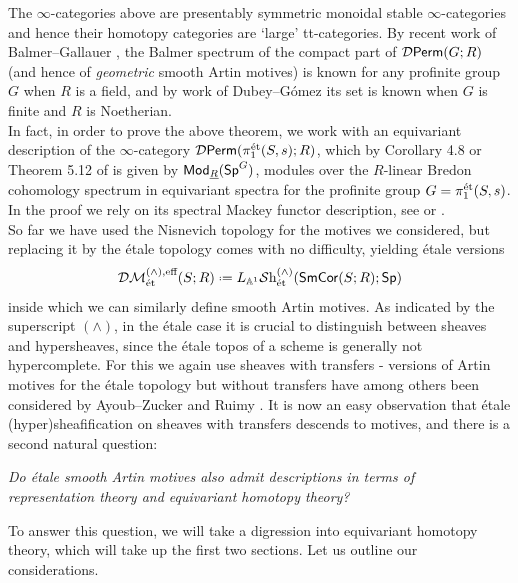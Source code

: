 \documentclass[reqno]{amsart}
\numberwithin{equation}{section}\theoremstyle{thms}
\theoremstyle{defn}
\newcommand{\bA}{\mathbb{A}}
\newcommand{\cD}{\mathcal{D}}
\newcommand{\tn}[1]{\textnormal{#1}}
\newcommand{\tsf}[1]{\textsf{\textup{#1}}}
\newcommand{\mcal}[1]{\mathcal{#1}}
\newcommand{\underl}[1]{\underline{#1}}
\newcommand*{\defeq}{\mathrel{\vcenter{\baselineskip0.4ex \lineskiplimit0pt
\hbox{\scriptsize.}\hbox{\scriptsize.}}}%
=}
\newcommand{\sheaves}{\mcal{S}\tn{h}}
\newcommand{\Mod}{\tsf{Mod}}
\newcommand{\spec}{\tsf{Sp}}
\newcommand{\specg}{\tsf{Sp}^G}
\newcommand{\corsms}[1]{\tsf{SmCor}(S;#1)}
\begin{document}
\noindent The $\infty$-categories above are presentably symmetric monoidal stable $\infty$-categories and hence their homotopy categories are `large' tt-categories. By recent work of Balmer--Gallauer \cite{bg25a,bg25b}, the Balmer spectrum of the compact part of $\cD\tsf{Perm}(G;R)$ (and hence of \emph{geometric} smooth Artin motives) is known for any profinite group $G$ when $R$ is a field, and by work of Dubey--Gómez \cite{dg25} its set is known when $G$ is finite and $R$ is Noetherian. \\
In fact, in order to prove the above theorem, we work with an equivariant description of the $\infty$-category $\cD\tsf{Perm}(\pi_1^{\tn{ét}}(S,s);R)$, which by Corollary 4.8 or Theorem 5.12 of \cite{fuh25} is given by $\Mod_{\underl{R}}(\specg)$, modules over the $R$-linear Bredon cohomology spectrum in equivariant spectra for the profinite group $G=\pi_1^{\tn{ét}}(S,s)$. In the proof we rely on its spectral Mackey functor description, see \cite[Example 2.15]{bcn25} or \cite[Corollary 3.18]{fuh25}.\\
So far we have used the Nisnevich topology for the motives we considered, but replacing it by the étale topology comes with no difficulty, yielding étale versions
$$\mcal{DM}_{\tn{ét}}^{(\wedge),\tn{eff}}(S;R) \defeq L_{\bA^1}\sheaves_{\tn{ét}}^{(\wedge)}(\corsms{R};\spec)$$
inside which we can similarly define smooth Artin motives. As indicated by the superscript $(\wedge)$, in the étale case it is crucial to distinguish between sheaves and hypersheaves, since the étale topos of a scheme is generally not hypercomplete. For this we again use sheaves with transfers - versions of Artin motives for the étale topology but without transfers have among others been considered by Ayoub--Zucker \cite{az12} and Ruimy \cite{rui25a,rui25b}. It is now an easy observation that étale (hyper)sheafification on sheaves with transfers descends to motives, and there is a second natural question:
\vspace{0.2cm}
\begin{center}
\emph{Do étale smooth Artin motives also admit descriptions in terms of \\ representation theory and equivariant homotopy theory?}
\end{center}
\vspace{0.2cm}
To answer this question, we will take a digression into equivariant homotopy theory, which will take up the first two sections. Let us outline our considerations. \\
\end{document}
